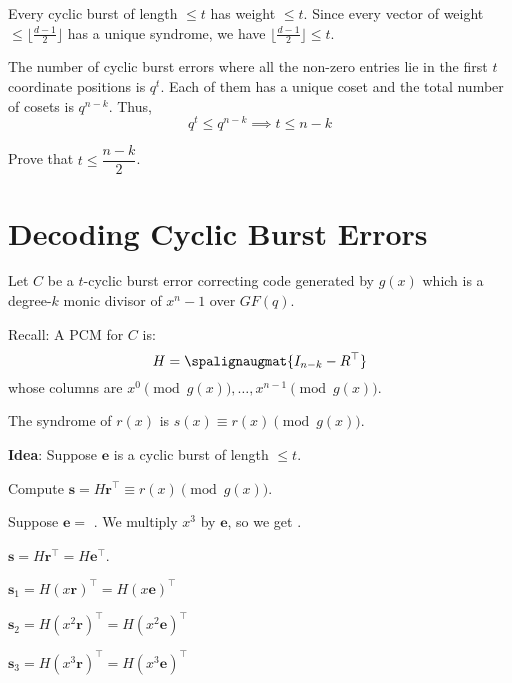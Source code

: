 \begin{Proof}{}{}
    Every cyclic burst of length $ \leqslant t $ has weight $ \leqslant t $.
    Since every vector of weight $ \leqslant \lfloor \frac{d-1}{2} \rfloor $
    has a unique syndrome, we have $ \lfloor \frac{d-1}{2} \rfloor \leqslant t $.

    The number of cyclic burst errors where all the non-zero entries lie in the first
    $ t $ coordinate positions is $ q^t $. Each of them has a unique coset
    and the total number of cosets is $ q^{n-k} $. Thus,
    \[ q^t\leqslant q^{n-k}\implies t\leqslant n-k \]
\end{Proof}

\begin{Exercise}{}{}
    Prove that $ t\leqslant \dfrac{n-k}{2} $.
\end{Exercise}

\section{Decoding Cyclic Burst Errors}
Let $ C $ be a $ t $-cyclic burst error correcting code generated
by $ g(x) $ which is a degree-$ k $ monic divisor of $ x^n-1 $ over $ GF(q) $.

Recall: A PCM for $ C $ is:
\[ H= \spalignaugmat{I_{n-k} -R^\top} \]
whose columns are $ x^0 \pmod{g(x)},\ldots ,x^{n-1} \pmod{g(x)} $.

The syndrome of $ r(x) $ is $ s(x)\equiv r(x)\pmod{g(x)} $.

\textbf{Idea}: Suppose $ \symbf{e} $ is a cyclic burst of length $ \leqslant t $.

Compute $ \symbf{s}=H\symbf{r}^\top\equiv r(x)\pmod{g(x)} $.

Suppose $ \symbf{e}= $ . We multiply $ x^3 $ by $ \symbf{e} $,
so we get .

$ \symbf{s}=H\symbf{r}^\top=H\symbf{e}^\top $.

$ \symbf{s}_1=H(x\symbf{r})^\top = H(x\symbf{e})^\top $

$ \symbf{s}_2=H(x^2\symbf{r})^\top = H(x^2\symbf{e})^\top $

$ \symbf{s}_3=H(x^3\symbf{r})^\top = H(x^3\symbf{e})^\top $
